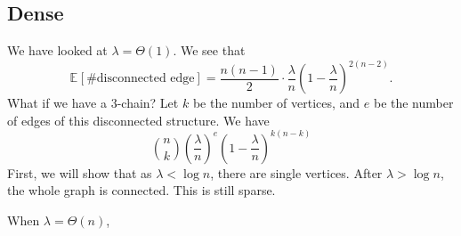 \subsection{Dense}
We have looked at \(\lambda = \Theta (1)\). We see that
\[
	\mathbb{E}_{}[\text{\# disconnected edge} ]
	= \frac{n(n-1)}{2} \cdot \frac{\lambda}{n} \left( 1 - \frac{\lambda}{n} \right) ^{2 (n-2)}.
\]
What if we have a 3-chain? Let \(k\) be the number of vertices, and \(e\) be the number of edges of this disconnected structure. We have
\[
	\binom{n}{k} \left( \frac{\lambda}{n} \right) ^e \left( 1 - \frac{\lambda}{n} \right) ^{k(n-k)}
\]
First, we will show that as \(\lambda < \log n\), there are single vertices. After \(\lambda > \log n\), the whole graph is connected. This is still sparse.

When \(\lambda = \Theta (n)\),